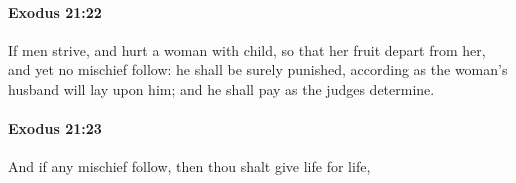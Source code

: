 		\paragraph{Exodus 21:22} %
			\label{EXODUS-21-22}

			If men strive, and hurt a woman with child, so that her fruit depart from her, and yet no mischief follow: he shall be surely punished, according as the woman's husband will lay upon him; and he shall pay as the judges determine.


		\paragraph{Exodus 21:23} %
			\label{EXODUS-21-23}

			And if any mischief follow, then thou shalt give life for life,


